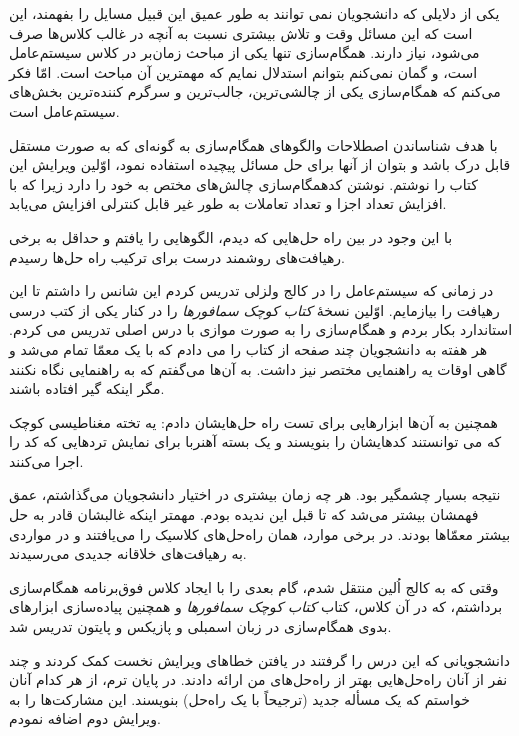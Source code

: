 \documentclass{book}
\begin{document}
یکی از دلایلی که دانشجویان نمی توانند به طور عمیق این قبیل مسایل را بفهمند، این است که این مسائل وقت و تلاش بیشتری نسبت به 
آنچه در غالب کلاس‌ها صرف می‌شود، نیاز دارند. 
همگام‌سازی تنها یکی از مباحث زمان‌بر در کلاس سیستم‌عامل  است،
و گمان نمی‌کنم بتوانم استدلال نمایم که مهمترین آن مباحث است. 
امّا فکر می‌کنم که همگام‌سازی یکی از چالشی‌ترین، جالب‌ترین و سرگرم‌ کننده‌ترین بخش‌های سیستم‌عامل است.

با هدف شناساندن  اصطلاحات والگوهای همگام‌سازی به گونه‌ای که به صورت مستقل قابل درک باشد و بتوان از آنها برای حل مسائل پیچیده استفاده نمود، 
اوّلین ویرایش این کتاب را نوشتم.
نوشتن کدهمگام‌سازی چالش‌های مختص به خود را دارد زیرا که با افزایش تعداد اجزا و تعداد تعاملات به طور غیر قابل کنترلی افزایش می‌‌یابد.

با این وجود در بین راه حل‌هایی که دیدم، الگوهایی را یافتم و حداقل به برخی رهیافت‌های روشمند درست برای ترکیب راه حل‌ها رسیدم.

در زمانی که سیستم‌عامل را در کالج ولزلی تدریس کردم این شانس را داشتم تا این رهیافت را بیازمایم. 
اوّلین نسخهٔ \emph{کتاب کوچک سمافورها} را در کنار یکی از کتب درسی استاندارد بکار بردم و همگام‌سازی را به صورت موازی با درس اصلی تدریس می کردم.
هر هفته به دانشجویان چند صفحه از کتاب را می دادم که با یک معمّا تمام می‌شد و گاهی اوقات یه راهنمایی مختصر نیز داشت. 
به آن‌ها می‌گفتم که به راهنمایی نگاه نکنند مگر اینکه گیر افتاده باشند.

همچنین به آن‌ها ابزارهایی برای تست راه حل‌هایشان دادم: 
یه تخته مغناطیسی کوچک که می توانستند کدهایشان را بنویسند و یک بسته آهنربا برای نمایش تردهایی که کد را اجرا می‌کنند.

نتیجه بسیار چشمگیر بود. 
هر چه زمان بیشتری در اختیار دانشجویان می‌گذاشتم، عمق فهمشان بیشتر می‌شد که تا قبل این ندیده بودم. 
    مهمتر اینکه غالبشان قادر به حل بیشتر معمّاها بودند.
    در برخی موارد،‌ همان راه‌حل‌های کلاسیک را می‌یافتند و در مواردی به رهیافت‌های خلاقانه جدیدی می‌رسیدند. 
    
وقتی که به کالج اُلین منتقل شدم،‌ 
گام بعدی را با ایجاد کلاس فوق‌برنامه همگام‌سازی برداشتم، که در آن کلاس، کتاب \emph{کتاب کوچک سمافورها}  
و همچنین پیاده‌سازی ابزارهای بدوی همگام‌سازی در زبان اسمبلی  و پازیکس و پایتون تدریس شد.

دانشجویانی که این درس را گرفتند در یافتن خطاهای ویرایش نخست کمک کردند و چند نفر از آنان راه‌حل‌هایی بهتر از راه‌حل‌های من ارائه دادند. 
در پایان ترم، از هر کدام آنان خواستم که یک مسأله جدید (ترجیحاً با یک راه‌حل) بنویسند. این مشارکت‌ها را به ویرایش دوم اضافه نمودم. 
\end{document}
